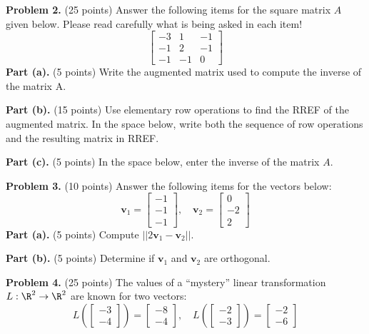 \documentclass[12pt]{article}
\begin{document}
\textbf{Problem 2.} (25 points) Answer the following items for the square matrix $A$ given below. Please read carefully what is being asked in each item!
\[
\left[\begin{matrix}-3 & 1 & -1\\-1 & 2 & -1\\-1 & -1 & 0\end{matrix}\right]
\]
\textbf{Part (a).} (5 points) Write the augmented matrix used to compute the inverse of the matrix A.

\vskip1in

\textbf{Part (b).} (15 points) Use elementary row operations to find the RREF of the augmented matrix.
In the space below, write both the sequence of row operations and the resulting matrix in RREF.

\vskip3.5in

\textbf{Part (c).} (5 points) In the space below, enter the inverse of the matrix $A$.

\clearpage

\textbf{Problem 3.} (10 points) Answer the following items for the vectors below:
\[
\mathbf{v}_1=\left[\begin{matrix}-1\\-1\\-1\end{matrix}\right],\quad
\mathbf{v}_2=\left[\begin{matrix}0\\-2\\2\end{matrix}\right]
\]
\textbf{Part (a).} (5 points) Compute $||2\textbf{v}_1-\textbf{v}_2||$.

\vskip3.5in

\textbf{Part (b).} (5 points) Determine if $\textbf{v}_1$ and $\textbf{v}_2$ are orthogonal.

\clearpage

\textbf{Problem 4.} (25 points) The values of a ``mystery'' linear transformation $L:\R^2\to\R^2$ are known for two vectors:
\[
L\left(\left[\begin{matrix}-3\\-4\end{matrix}\right]\right)=\left[\begin{matrix}-8\\-4\end{matrix}\right],\quad L\left(\left[\begin{matrix}-2\\-3\end{matrix}\right]\right)=\left[\begin{matrix}-2\\-6\end{matrix}\right]
\]
\end{document}
